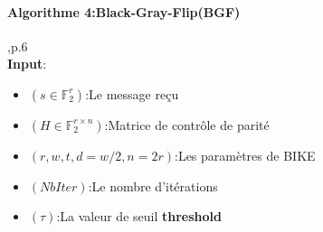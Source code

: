 \documentclass[12pt,openany]{report}
\begin{document}
\paragraph{Algorithme 4:Black-Gray-Flip(BGF)} \cite{drucker2019} ,p.6\\
\textbf{Input}:\begin{itemize}
  \item[] $(s\in \mathbb{F}^{r}_2)$:Le message reçu
  \item[] $(\mathit{H}\in \mathbb{F}^{r\times n}_2)$:Matrice de contrôle de parité
  \item[] $(r,w,t,d=w/2,n=2r)$:Les paramètres de BIKE
  \item[] $(NbIter)$:Le nombre d'itérations
  \item[] $(\tau)$:La valeur de seuil \textbf{threshold}
\end{itemize}
\end{document}
